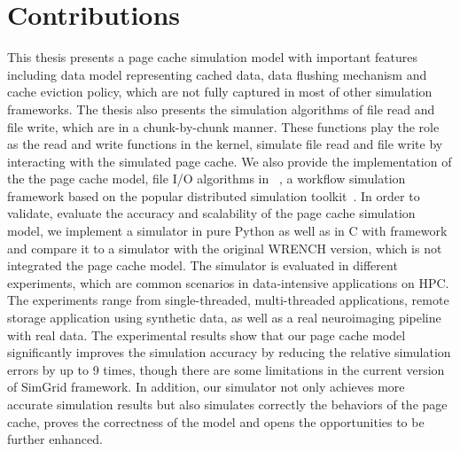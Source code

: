 \section{Contributions}

This thesis presents a page cache simulation model with important features 
including data model representing cached data, data flushing mechanism and 
cache eviction policy, which are not fully captured in most of other 
simulation frameworks. 
The thesis also presents the simulation algorithms of file read and file write, 
which are in a chunk-by-chunk manner. 
These functions play the role as the read and write functions in the kernel, 
simulate file read and file write by interacting with the simulated page cache.
We also provide the implementation of the the page cache model, 
file I/O algorithms in \wrench~\cite{casanova2020fgcs}, 
a workflow simulation framework based on the popular 
\simgrid distributed simulation toolkit~\cite{casanova2014simgrid}. 
In order to validate, evaluate the accuracy and scalability of the page cache 
simulation model, we implement a simulator in pure Python as well as 
in C with \wrench framework and compare it to a simulator with the original 
WRENCH version, which is not integrated the page cache model. 
The simulator is evaluated in different experiments, which are common 
scenarios in data-intensive applications on HPC.
The experiments range from single-threaded, multi-threaded applications, 
remote storage application using synthetic data, as well as a real neuroimaging 
pipeline with real data.
The experimental results show that our page cache model significantly improves 
the simulation accuracy by reducing the relative simulation errors by up to 9 times, 
though there are some limitations in the current version of SimGrid framework. 
In addition, our simulator not only achieves more accurate simulation results 
but also simulates correctly the behaviors of the page cache, proves the correctness 
of the model and opens the opportunities to be further enhanced. 


